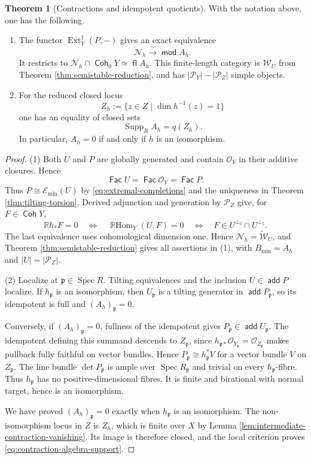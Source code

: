 \documentclass[a4paper,reqno]{amsart}
\def\E{\mathcal{E}}
\def\O{\mathcal{O}}
\def\P{\mathcal{P}}
\def\W{\mathcal{W}}
\DeclareMathOperator{\md}{\mathsf{mod}}
\renewcommand{\mod}{\md}
\DeclareMathOperator{\fl}{\mathsf{fl}}
\DeclareMathOperator{\add}{\mathsf{add}}
\DeclareMathOperator{\Fac}{\mathsf{Fac}}
\DeclareMathOperator{\Coh}{\mathsf{Coh}}
\DeclareMathOperator{\Ext}{Ext}
\DeclareMathOperator{\Spec}{Spec}
\DeclareMathOperator{\RHom}{\mathbb{R}Hom}
\theoremstyle{definition}
\newtheorem{Thm}{Theorem}[section]
\begin{document}
\begin{Thm}[Contractions and idempotent quotients]\label{thm:contraction-null-category}
With the notation above, one has the following.
\begin{enumerate}
\item The functor $\Ext_Y^1(P,-)$ gives an exact equivalence
\begin{equation}\label{eq:contraction-null-equivalence}
\mathcal N_h\xrightarrow{\ \sim\ }\mod A_h.
\end{equation}
It restricts to $\mathcal N_h\cap\Coh_0Y\simeq\fl A_h$. This finite-length category is $\W_U$ from Theorem \ref{thm:semistable-reduction}, and has $|\P_Y|-|\P_Z|$ simple objects.
\item For the reduced closed locus
\[
Z_h:=\{z\in Z\mid\dim h^{-1}(z)=1\}
\]
one has an equality of closed sets
\begin{equation}\label{eq:contraction-algebra-support}
\operatorname{Supp}_R A_h=q(Z_h).
\end{equation}
In particular, $A_h=0$ if and only if $h$ is an isomorphism.
\end{enumerate}
\end{Thm}
\begin{proof}
(1) Both $U$ and $P$ are globally generated and contain $\O_Y$ in their additive closures. Hence
\[
\Fac U=\Fac\O_Y=\Fac P.
\]
Thus $P\cong\E_{\min}(U)$ by \eqref{eq:extremal-completions} and the uniqueness in Theorem \ref{thm:tilting-torsion}.
Derived adjunction and generation by $\P_Z$ give, for $F\in\Coh Y$,
\[
\mathbb Rh_*F=0
\quad\Longleftrightarrow\quad
\RHom_Y(U,F)=0
\quad\Longleftrightarrow\quad
F\in U^{\perp_0}\cap U^{\perp_1}.
\]
The last equivalence uses cohomological dimension one. Hence $\mathcal N_h=\widetilde{\W}_U$, and Theorem \ref{thm:semistable-reduction} gives all assertions in (1), with $B_{\min}=A_h$ and $|U|=|\P_Z|$.

(2) Localize at $\mathfrak p\in\Spec R$. Tilting equivalences and the inclusion $U\in\add P$ localize. If $h_{\mathfrak p}$ is an isomorphism, then $U_{\mathfrak p}$ is a tilting generator in $\add P_{\mathfrak p}$, so its idempotent is full and $(A_h)_{\mathfrak p}=0$.

Conversely, if $(A_h)_{\mathfrak p}=0$, fullness of the idempotent gives $P_{\mathfrak p}\in\add U_{\mathfrak p}$. The idempotent defining this summand descends to $Z_{\mathfrak p}$, since $h_{\mathfrak p*}\O_{Y_{\mathfrak p}}=\O_{Z_{\mathfrak p}}$ makes pullback fully faithful on vector bundles. Hence $P_{\mathfrak p}\cong h_{\mathfrak p}^*V$ for a vector bundle $V$ on $Z_{\mathfrak p}$. The line bundle $\det P_{\mathfrak p}$ is ample over $\Spec R_{\mathfrak p}$ and trivial on every $h_{\mathfrak p}$-fibre. Thus $h_{\mathfrak p}$ has no positive-dimensional fibres. It is finite and birational with normal target, hence is an isomorphism.

We have proved $(A_h)_{\mathfrak p}=0$ exactly when $h_{\mathfrak p}$ is an isomorphism. The non-isomorphism locus in $Z$ is $Z_h$, which is finite over $X$ by Lemma \ref{lem:intermediate-contraction-vanishing}. Its image is therefore closed, and the local criterion proves \eqref{eq:contraction-algebra-support}.
\end{proof}
\end{document}
